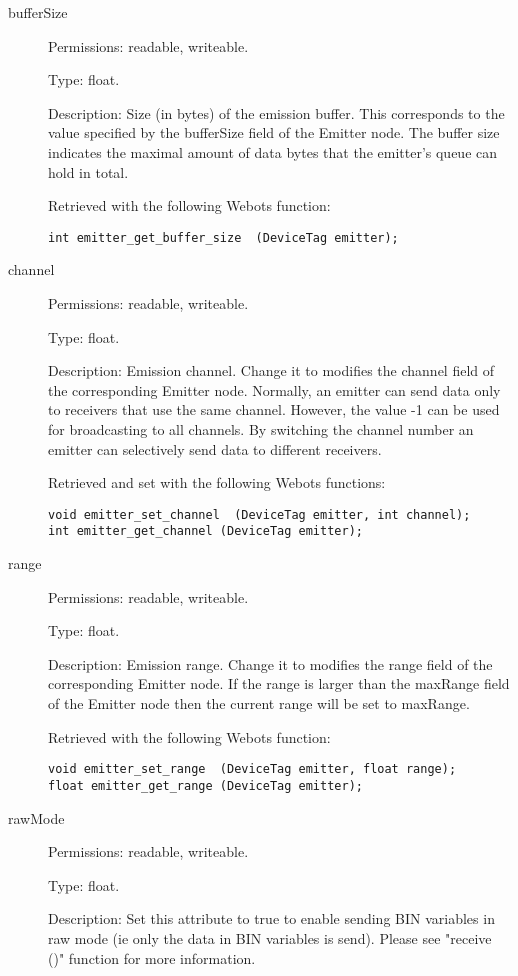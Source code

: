 \noindent
\begin{description}
\item[{         bufferSize
  }]            Permissions: readable, writeable.


  Type: float.


  Description: Size (in bytes) of the emission buffer. This
  corresponds to the value specified by the bufferSize field of the
  Emitter node. The buffer size indicates the maximal amount of data
  bytes that the emitter's queue can hold in total.


  Retrieved with the following Webots function:


\begin{lstlisting}
int emitter_get_buffer_size  (DeviceTag emitter);
\end{lstlisting}
\item[{         channel
  }]            Permissions: readable, writeable.


  Type: float.


  Description: Emission channel. Change it to modifies the channel
  field of the corresponding Emitter node. Normally, an emitter can
  send data only to receivers that use the same channel. However, the
  value -{}1 can be used for broadcasting to all channels. By
  switching the channel number an emitter can selectively send data to
  different receivers.


  Retrieved and set with the following Webots functions:


\begin{lstlisting}
void emitter_set_channel  (DeviceTag emitter, int channel);
int emitter_get_channel (DeviceTag emitter);
\end{lstlisting}
\item[{         range
 }]            Permissions: readable, writeable.


 Type: float.


 Description: Emission range. Change it to modifies the range field of
 the corresponding Emitter node. If the range is larger than the
 maxRange field of the Emitter node then the current range will be set
 to maxRange.


          Retrieved with the following Webots function:


\begin{lstlisting}
void emitter_set_range  (DeviceTag emitter, float range);
float emitter_get_range (DeviceTag emitter);
\end{lstlisting}
\item[{         rawMode
 }]            Permissions: readable, writeable.


 Type: float.


 Description: Set this attribute to true to enable sending BIN
 variables in raw mode (ie only the data in BIN variables is
 send). Please see "receive ()" function for more information.

\end{description}

